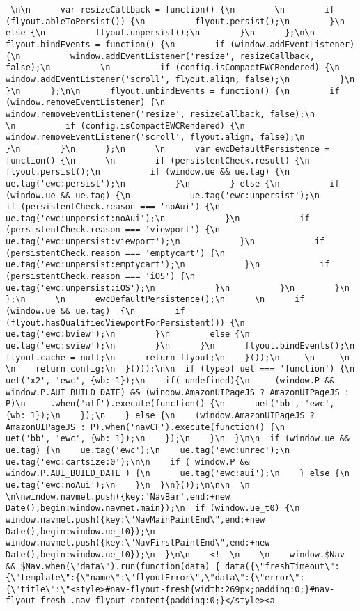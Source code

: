 \documentclass[
]{article}
\begin{document}
\begin{verbatim}
 \n\n      var resizeCallback = function() {\n        \n        if (flyout.ableToPersist()) {\n          flyout.persist();\n        }\n        else {\n          flyout.unpersist();\n        }\n      };\n\n      flyout.bindEvents = function() {\n        if (window.addEventListener) {\n          window.addEventListener('resize', resizeCallback, false);\n          \n          if (config.isCompactEWCRendered) {\n            window.addEventListener('scroll', flyout.align, false);\n          }\n        }\n      };\n\n      flyout.unbindEvents = function() {\n        if (window.removeEventListener) {\n          window.removeEventListener('resize', resizeCallback, false);\n          \n          if (config.isCompactEWCRendered) {\n            window.removeEventListener('scroll', flyout.align, false);\n          }\n        }\n      };\n      \n      var ewcDefaultPersistence = function() {\n      \n        if (persistentCheck.result) {\n          flyout.persist();\n          if (window.ue && ue.tag) {\n            ue.tag('ewc:persist');\n          }\n        } else {\n          if (window.ue && ue.tag) {\n            ue.tag('ewc:unpersist');\n            if (persistentCheck.reason === 'noAui') {\n              ue.tag('ewc:unpersist:noAui');\n            }\n            if (persistentCheck.reason === 'viewport') {\n              ue.tag('ewc:unpersist:viewport');\n            }\n            if (persistentCheck.reason === 'emptycart') {\n              ue.tag('ewc:unpersist:emptycart');\n            }\n            if (persistentCheck.reason === 'iOS') {\n              ue.tag('ewc:unpersist:iOS');\n            }\n          }\n        }\n      };\n      \n      ewcDefaultPersistence();\n      \n      if (window.ue && ue.tag)  {\n        if (flyout.hasQualifiedViewportForPersistent()) {\n          ue.tag('ewc:bview');\n        }\n        else {\n          ue.tag('ewc:sview');\n        }\n      }\n      flyout.bindEvents();\n      flyout.cache = null;\n      return flyout;\n    }());\n     \n     \n     \n    return config;\n  }()));\n\n  if (typeof uet === 'function') {\n    uet('x2', 'ewc', {wb: 1});\n    if( undefined){\n     (window.P && window.P.AUI_BUILD_DATE) && (window.AmazonUIPageJS ? AmazonUIPageJS : P)\n     .when('atf').execute(function() {\n      uet('bb', 'ewc', {wb: 1});\n    });\n    } else {\n    (window.AmazonUIPageJS ? AmazonUIPageJS : P).when('navCF').execute(function() {\n      uet('bb', 'ewc', {wb: 1});\n    });\n    }\n  }\n\n  if (window.ue && ue.tag) {\n    ue.tag('ewc');\n    ue.tag('ewc:unrec');\n    ue.tag('ewc:cartsize:0');\n\n    if ( window.P && window.P.AUI_BUILD_DATE ) {\n      ue.tag('ewc:aui');\n    } else {\n      ue.tag('ewc:noAui');\n    }\n  }\n}());\n\n\n  \n  \n\nwindow.navmet.push({key:'NavBar',end:+new Date(),begin:window.navmet.main});\n  if (window.ue_t0) {\n    window.navmet.push({key:\"NavMainPaintEnd\",end:+new Date(),begin:window.ue_t0});\n    window.navmet.push({key:\"NavFirstPaintEnd\",end:+new Date(),begin:window.ue_t0});\n  }\n\n    <!--\n    \n    window.$Nav && $Nav.when(\"data\").run(function(data) { data({\"freshTimeout\":{\"template\":{\"name\":\"flyoutError\",\"data\":{\"error\":{\"title\":\"<style>#nav-flyout-fresh{width:269px;padding:0;}#nav-flyout-fresh .nav-flyout-content{padding:0;}</style><a 
\end{verbatim}
\end{document}
